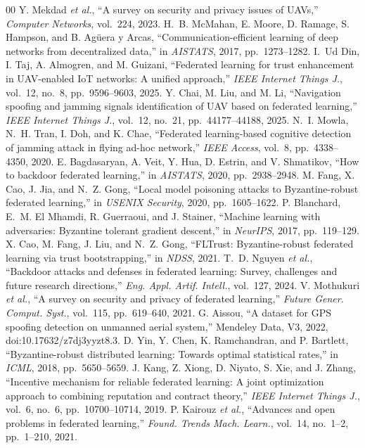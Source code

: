 \documentclass[conference]{IEEEtran}
\begin{document}
\begin{thebibliography}{00}
 Y. Mekdad \emph{et al.}, ``A survey on security and privacy issues of UAVs,'' \emph{Computer Networks}, vol.~224, 2023.
 H.~B. McMahan, E. Moore, D. Ramage, S. Hampson, and B. Ag\"{u}era y Arcas, ``Communication-efficient learning of deep networks from decentralized data,'' in \emph{AISTATS}, 2017, pp.~1273--1282.
 I.~Ud Din, I. Taj, A. Almogren, and M. Guizani, ``Federated learning for trust enhancement in UAV-enabled IoT networks: A unified approach,'' \emph{IEEE Internet Things J.}, vol.~12, no.~8, pp.~9596--9603, 2025.
 Y. Chai, M. Liu, and M. Li, ``Navigation spoofing and jamming signals identification of UAV based on federated learning,'' \emph{IEEE Internet Things J.}, vol.~12, no.~21, pp.~44177--44188, 2025.
 N.~I. Mowla, N.~H. Tran, I. Doh, and K. Chae, ``Federated learning-based cognitive detection of jamming attack in flying ad-hoc network,'' \emph{IEEE Access}, vol.~8, pp.~4338--4350, 2020.
 E. Bagdasaryan, A. Veit, Y. Hua, D. Estrin, and V. Shmatikov, ``How to backdoor federated learning,'' in \emph{AISTATS}, 2020, pp.~2938--2948.
 M. Fang, X. Cao, J. Jia, and N.~Z. Gong, ``Local model poisoning attacks to Byzantine-robust federated learning,'' in \emph{USENIX Security}, 2020, pp.~1605--1622.
 P. Blanchard, E.~M. El Mhamdi, R. Guerraoui, and J. Stainer, ``Machine learning with adversaries: Byzantine tolerant gradient descent,'' in \emph{NeurIPS}, 2017, pp.~119--129.
 X. Cao, M. Fang, J. Liu, and N.~Z. Gong, ``FLTrust: Byzantine-robust federated learning via trust bootstrapping,'' in \emph{NDSS}, 2021.
 T.~D. Nguyen \emph{et al.}, ``Backdoor attacks and defenses in federated learning: Survey, challenges and future research directions,'' \emph{Eng. Appl. Artif. Intell.}, vol.~127, 2024.
 V. Mothukuri \emph{et al.}, ``A survey on security and privacy of federated learning,'' \emph{Future Gener. Comput. Syst.}, vol.~115, pp.~619--640, 2021.
 G. Aissou, ``A dataset for GPS spoofing detection on unmanned aerial system,'' Mendeley Data, V3, 2022, doi:10.17632/z7dj3yyzt8.3.
 D. Yin, Y. Chen, K. Ramchandran, and P. Bartlett, ``Byzantine-robust distributed learning: Towards optimal statistical rates,'' in \emph{ICML}, 2018, pp.~5650--5659.
 J. Kang, Z. Xiong, D. Niyato, S. Xie, and J. Zhang, ``Incentive mechanism for reliable federated learning: A joint optimization approach to combining reputation and contract theory,'' \emph{IEEE Internet Things J.}, vol.~6, no.~6, pp.~10700--10714, 2019.
 P. Kairouz \emph{et al.}, ``Advances and open problems in federated learning,'' \emph{Found. Trends Mach. Learn.}, vol.~14, no.~1--2, pp.~1--210, 2021.
\end{thebibliography}
\end{document}
